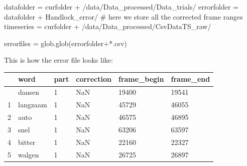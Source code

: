 \documentclass[
  letterpaper,
  DIV=11,
  numbers=noendperiod]{scrreprt}
\newenvironment{Shaded}{\begin{snugshade}}{\end{snugshade}}
\newcommand{\CommentTok}[1]{\textcolor[rgb]{0.37,0.37,0.37}{#1}}
\newcommand{\NormalTok}[1]{\textcolor[rgb]{0.00,0.23,0.31}{#1}}
\newcommand{\OperatorTok}[1]{\textcolor[rgb]{0.37,0.37,0.37}{#1}}
\newcommand{\StringTok}[1]{\textcolor[rgb]{0.13,0.47,0.30}{#1}}
\begin{document}
\begin{Shaded}
\begin{Highlighting}[]
\NormalTok{datafolder }\OperatorTok{=}\NormalTok{ curfolder }\OperatorTok{+} \StringTok{\textquotesingle{}/data/Data\_processed/Data\_trials/\textquotesingle{}}
\NormalTok{errorfolder }\OperatorTok{=}\NormalTok{ datafolder }\OperatorTok{+} \StringTok{\textquotesingle{}Handlock\_error/\textquotesingle{}} \CommentTok{\# here we store all the corrected frame ranges}
\NormalTok{timeseries }\OperatorTok{=}\NormalTok{ curfolder }\OperatorTok{+} \StringTok{\textquotesingle{}/data/Data\_processed/CsvDataTS\_raw/\textquotesingle{}}

\NormalTok{errorfiles }\OperatorTok{=}\NormalTok{ glob.glob(errorfolder}\OperatorTok{+}\StringTok{\textquotesingle{}*.csv\textquotesingle{}}\NormalTok{)}
\end{Highlighting}
\end{Shaded}

This is how the error file looks like:

\begin{longtable}[]{@{}llllll@{}}
\toprule\noalign{}
& word & part & correction & frame\_begin & frame\_end \\
\midrule\noalign{}
\endhead
\bottomrule\noalign{}
\endlastfoot
0 & dansen & 1 & NaN & 19400 & 19541 \\
1 & langzaam & 1 & NaN & 45729 & 46055 \\
2 & auto & 1 & NaN & 46575 & 46895 \\
3 & snel & 1 & NaN & 63206 & 63597 \\
4 & bitter & 1 & NaN & 22160 & 22327 \\
5 & walgen & 1 & NaN & 26725 & 26897 \\
\end{longtable}
\end{document}
